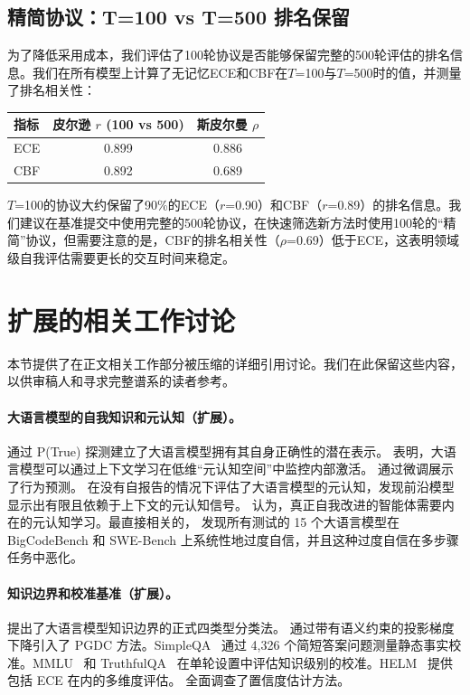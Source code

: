 \documentclass[11pt,a4paper,fontset=fandol]{ctexart}
\begin{document}
\subsection{精简协议：T=100 vs T=500 排名保留}

为了降低采用成本，我们评估了100轮协议是否能够保留完整的500轮评估的排名信息。我们在所有模型上计算了无记忆ECE和CBF在$T$=100与$T$=500时的值，并测量了排名相关性：

\begin{center}
\small
\begin{tabular}{lcc}
\toprule
\textbf{指标} & \textbf{皮尔逊 $r$ (100 vs 500)} & \textbf{斯皮尔曼 $\rho$} \\
\midrule
ECE & 0.899 & 0.886 \\
CBF & 0.892 & 0.689 \\
\bottomrule
\end{tabular}
\end{center}

$T$=100的协议大约保留了90\%的ECE（$r$=0.90）和CBF（$r$=0.89）的排名信息。我们建议在基准提交中使用完整的500轮协议，在快速筛选新方法时使用100轮的“精简”协议，但需要注意的是，CBF的排名相关性（$\rho$=0.69）低于ECE，这表明领域级自我评估需要更长的交互时间来稳定。

\section{扩展的相关工作讨论}
\label{app:related_extended}

本节提供了在正文相关工作部分被压缩的详细引用讨论。我们在此保留这些内容，以供审稿人和寻求完整谱系的读者参考。

\paragraph{大语言模型的自我知识和元认知（扩展）。}
\citet{kadavath2022language} 通过 P(True) 探测建立了大语言模型拥有其自身正确性的潜在表示。 \citet{jian2025metacognition} 表明，大语言模型可以通过上下文学习在低维“元认知空间”中监控内部激活。 \citet{binder2025introspection} 通过微调展示了行为预测。 \citet{ackerman2026metacognition} 在没有自报告的情况下评估了大语言模型的元认知，发现前沿模型显示出有限且依赖于上下文的元认知信号。 \citet{liu2025metacognitive_learning} 认为，真正自我改进的智能体需要内在的元认知学习。最直接相关的，\citet{barkan2026capable} 发现所有测试的 15 个大语言模型在 BigCodeBench 和 SWE-Bench 上系统性地过度自信，并且这种过度自信在多步骤任务中恶化。

\paragraph{知识边界和校准基准（扩展）。}
\citet{li2025knowledge_boundary} 提出了大语言模型知识边界的正式四类型分类法。 \citet{yin2024benchmarking_boundary} 通过带有语义约束的投影梯度下降引入了 PGDC 方法。SimpleQA~\citep{wei2024simpleqa} 通过 4,326 个简短答案问题测量静态事实校准。MMLU~\citep{hendrycks2021measuring} 和 TruthfulQA~\citep{lin2022truthfulqa} 在单轮设置中评估知识级别的校准。HELM~\citep{liang2022helm} 提供包括 ECE 在内的多维度评估。 \citet{geng2024survey} 全面调查了置信度估计方法。
\end{document}
